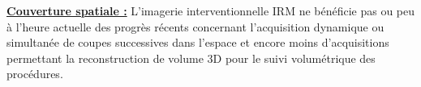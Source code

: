
\underline{\textbf{Couverture spatiale :}} L’imagerie interventionnelle IRM ne bénéficie pas ou peu à l’heure actuelle des progrès récents concernant l’acquisition dynamique ou simultanée de coupes successives dans l’espace et encore moins d’acquisitions permettant la reconstruction de volume 3D pour le suivi volumétrique des procédures.\\
